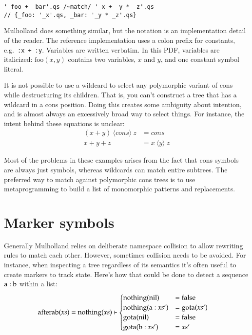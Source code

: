 \documentclass{report}
\begin{document}
\begin{verbatim}
'_foo + _bar'.qs /~match/ '_x + _y * _z'.qs
// {_foo: '_x'.qs, _bar: '_y * _z'.qs}
\end{verbatim}

    Mulholland does something similar, but the notation is an implementation detail of the reader. The reference implementation uses a colon prefix for constants, e.g.~{\tt :x + :y}. Variables
    are written verbatim. In this PDF, variables are italicized: $\textrm{foo}(x, y)$ contains two variables, $x$ and $y$, and one constant symbol literal.

    It is not possible to use a wildcard to select any polymorphic variant of cons while destructuring its children. That is, you can't construct a tree that has a wildcard in a cons position.
    Doing this creates some ambiguity about intention, and is almost always an excessively broad way to select things. For instance, the intent behind these equations is unclear:
\begin{align*}
(x + y)~\langle cons\rangle~z & = cons \\
x + y + z                     & = x~\langle y\rangle~z
\end{align*}

    Most of the problems in these examples arises from the fact that cons symbols are always just symbols, whereas wildcards can match entire subtrees. The preferred way to match against
    polymorphic cons trees is to use metaprogramming to build a list of monomorphic patterns and replacements.

\section{Marker symbols}
    Generally Mulholland relies on deliberate namespace collision to allow rewriting rules to match each other. However, sometimes collision needs to be avoided. For instance, when inspecting
    a tree regardless of its semantics it's often useful to create markers to track state. Here's how that could be done to detect a sequence $\textrm a : \textrm b$ within a list:
\begin{align*}
\textrm{afterab}(xs) & = \textrm{nothing}(xs) \vdash \begin{cases}
                                                       \textrm{nothing}(\textrm{nil})    & = \textrm{false} \\
                                                       \textrm{nothing}(\textrm a : xs') & = \textrm{gota}(xs') \\
                                                       \textrm{gota}(\textrm{nil})       & = \textrm{false} \\
                                                       \textrm{gota}(\textrm b : xs')    & = xs'
                                                     \end{cases}
\end{align*}
\end{document}
